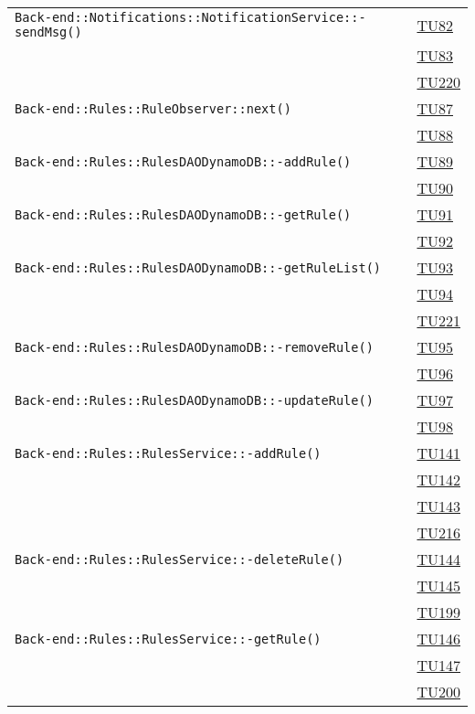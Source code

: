 \begin{longtable}{|>{\centering}m{12cm}|m{1cm}<{\centering}|}
\texttt{Back-end::Notifications::NotificationService::-\linebreak sendMsg()} & \hyperlink{TU82}{TU82}\\ & \hyperlink{TU83}{TU83}\\ & \hyperlink{TU220}{TU220}\\ \hline
\texttt{Back-end::Rules::RuleObserver::next()} & \hyperlink{TU87}{TU87}\\ & \hyperlink{TU88}{TU88}\\ \hline
\texttt{Back-end::Rules::RulesDAODynamoDB::-\linebreak addRule()} & \hyperlink{TU89}{TU89}\\ & \hyperlink{TU90}{TU90}\\ \hline
\texttt{Back-end::Rules::RulesDAODynamoDB::-\linebreak getRule()} & \hyperlink{TU91}{TU91}\\ & \hyperlink{TU92}{TU92}\\ \hline
\texttt{Back-end::Rules::RulesDAODynamoDB::-\linebreak getRuleList()} & \hyperlink{TU93}{TU93}\\ & \hyperlink{TU94}{TU94}\\ & \hyperlink{TU221}{TU221}\\ \hline
\texttt{Back-end::Rules::RulesDAODynamoDB::-\linebreak removeRule()} & \hyperlink{TU95}{TU95}\\ & \hyperlink{TU96}{TU96}\\ \hline
\texttt{Back-end::Rules::RulesDAODynamoDB::-\linebreak updateRule()} & \hyperlink{TU97}{TU97}\\ & \hyperlink{TU98}{TU98}\\ \hline
\texttt{Back-end::Rules::RulesService::-\linebreak addRule()} & \hyperlink{TU141}{TU141}\\ & \hyperlink{TU142}{TU142}\\ & \hyperlink{TU143}{TU143}\\ & \hyperlink{TU216}{TU216}\\ \hline
\texttt{Back-end::Rules::RulesService::-\linebreak deleteRule()} & \hyperlink{TU144}{TU144}\\ & \hyperlink{TU145}{TU145}\\ & \hyperlink{TU199}{TU199}\\ \hline
\texttt{Back-end::Rules::RulesService::-\linebreak getRule()} & \hyperlink{TU146}{TU146}\\ & \hyperlink{TU147}{TU147}\\ & \hyperlink{TU200}{TU200}\\ \hline

\end{longtable}
